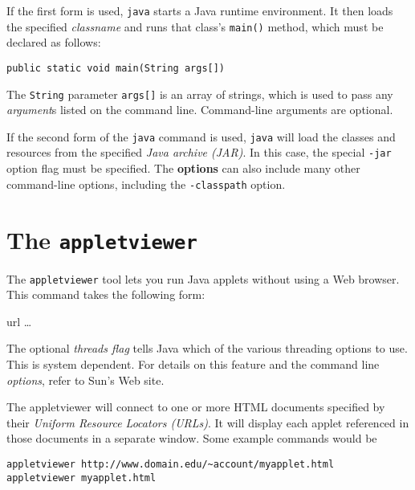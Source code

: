 \vspace{6pt plus3pt minus2pt}\noindent If the first form is used, {\tt java} starts a Java runtime
environment.   It then loads the specified {\it classname} and runs
that class's {\tt main()} method, which must be declared as follows:

\begin{jjjlisting}
\begin{lstlisting}
public static void main(String args[])
\end{lstlisting}
\end{jjjlisting}

\noindent The {\tt String} parameter {\tt args[]} is an array
of strings, which is used to pass any {\it argument}s listed on the
command line.  Command-line arguments are optional.

If the second form of the {\tt java} command is used, {\tt java} will
load the classes and resources from the specified {\it Java archive
(JAR)}. In this case, the special {\tt -jar} option flag must be
specified. The {\bf options} can also include many other command-line
options, including the {\tt -classpath} option.


\section*{The {\tt appletviewer}}
\label{the}
\noindent The {\tt appletviewer} tool lets you run Java applets without using
a Web browser.   This command takes the following form:

\vspace{6pt plus3pt minus2pt}
  \qquad 
 [ {\it options } ] \qquad 
 url \dots

\vspace{6pt plus3pt minus2pt}\noindent The optional {\it threads flag} tells Java which of the various
threading options to use.  This is system dependent.  For details on
this feature and the command line {\it options}, refer to Sun's Web site.

The appletviewer will connect to one or more HTML documents specified
by their {\it Uniform Resource Locators (URLs)}. It will display each
applet referenced in those documents in a separate window.  Some
example commands would be

\begin{jjjlisting}
\begin{lstlisting}
appletviewer http://www.domain.edu/~account/myapplet.html
appletviewer myapplet.html
\end{lstlisting}
\end{jjjlisting}

